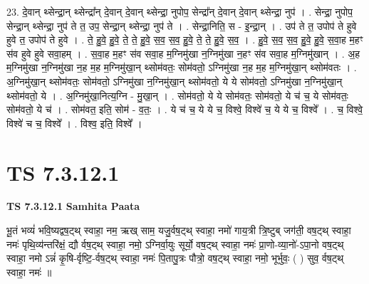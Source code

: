 \documentclass[17pt]{extarticle}
\begin{document}
23. दे॒वान् थ्सेन्द्रा॒न् थ्सेन्द्रा᳚न् दे॒वान् दे॒वान् थ्सेन्द्रा॒ नुपोप॒ सेन्द्रा᳚न् दे॒वान् दे॒वान् थ्सेन्द्रा॒ नुप॑ । . सेन्द्रा॒ नुपोप॒ सेन्द्रा॒न् थ्सेन्द्रा॒ नुप॑ ते त॒ उप॒ सेन्द्रा॒न् थ्सेन्द्रा॒ नुप॑ ते । . सेन्द्रा॒निति॒ स - इ॒न्द्रा॒न् । . उप॑ ते त॒ उपोप॑ ते हुवे हुवे त॒ उपोप॑ ते हुवे । . ते॒ हु॒वे॒ हु॒वे॒ ते॒ ते॒ हु॒वे॒ स॒व॒ स॒व॒ हु॒वे॒ ते॒ ते॒ हु॒वे॒ स॒व॒ । . हु॒वे॒ स॒व॒ स॒व॒ हु॒वे॒ हु॒वे॒ स॒वा॒ह म॒हꣳ स॑व हुवे हुवे सवा॒हम् । . स॒वा॒ह म॒हꣳ स॑व सवा॒ह म॒ग्निमु॑खा न॒ग्निमु॑खा न॒हꣳ स॑व सवा॒ह म॒ग्निमु॑खान् । . अ॒ह म॒ग्निमु॑खा न॒ग्निमु॑खा न॒ह म॒ह म॒ग्निमु॑खा॒न् थ्सोम॑वतः॒ सोम॑वतो॒ ऽग्निमु॑खा न॒ह म॒ह म॒ग्निमु॑खा॒न् थ्सोम॑वतः । . अ॒ग्निमु॑खा॒न् थ्सोम॑वतः॒ सोम॑वतो॒ ऽग्निमु॑खा न॒ग्निमु॑खा॒न् थ्सोम॑वतो॒ ये ये सोम॑वतो॒ ऽग्निमु॑खा न॒ग्निमु॑खा॒न् थ्सोम॑वतो॒ ये । . अ॒ग्निमु॑खा॒नित्य॒ग्नि - मु॒खा॒न् । . सोम॑वतो॒ ये ये सोम॑वतः॒ सोम॑वतो॒ ये च॑ च॒ ये सोम॑वतः॒ सोम॑वतो॒ ये च॑ । . सोम॑वत॒ इति॒ सोम॑ - व॒तः॒ । . ये च॑ च॒ ये ये च॒ विश्वे॒ विश्वे॑ च॒ ये ये च॒ विश्वे᳚ । . च॒ विश्वे॒ विश्वे॑ च च॒ विश्वे᳚ । . विश्व॒ इति॒ विश्वे᳚ । \newline
\pagebreak
{}

\section{ TS 7.3.12.1 }

\textbf{TS 7.3.12.1 } \newline
\textbf{Samhita Paata} \newline

भू॒तं भव्यं॑ भवि॒ष्यद्वष॒ट्थ् स्वाहा॒ नम॒ ऋख् साम॒ यजु॒र्वष॒ट्थ् स्वाहा॒ नमो॑ गाय॒त्री त्रि॒ष्टुब् जग॑ती॒ वष॒ट्थ् स्वाहा॒ नमः॑ पृथि॒व्य॑न्तरि॑क्षं॒ द्यौ र्वष॒ट्थ् स्वाहा॒ नमो॒ ऽग्निर्वा॒युः सूर्यो॒ वष॒ट्थ् स्वाहा॒ नमः॑ प्रा॒णो-व्या॒नो॑-ऽपा॒नो वष॒ट्थ् स्वाहा॒ नमो ऽन्नं॑ कृ॒षि-र्वृष्टि॒-र्वष॒ट्थ् स्वाहा॒ नमः॑ पि॒तापु॒त्रः पौत्रो॒ वष॒ट्थ् स्वाहा॒ नमो॒ भूर्भुवः॒ ( ) सुव॒ र्वष॒ट्थ् स्वाहा॒ नमः॑ ॥ \newline
\end{document}
